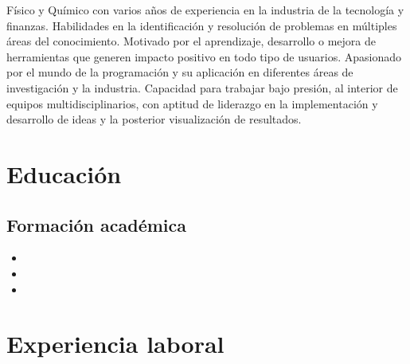 \documentclass[11pt, letterpaper, sans]{moderncv}        %
\begin{document}
\maketitle

\small{
Físico y Químico con varios años de experiencia en la industria de la tecnología y finanzas. Habilidades en la identificación y resolución de problemas en múltiples áreas del conocimiento. Motivado por el aprendizaje, desarrollo o mejora de herramientas que generen impacto positivo en todo tipo de usuarios. Apasionado por el mundo de la programación y su aplicaci\'on en diferentes \'areas de investigaci\'on y la industria. Capacidad para trabajar bajo presión, al interior de equipos multidisciplinarios, con aptitud de liderazgo en la implementaci\'on y desarrollo de ideas y la posterior visualizaci\'on de resultados.
}

\section{Educación}

\vspace{5pt}

\subsection{Formación académica}

\vspace{5pt}

\begin{itemize}
	\item{}
	\item{}
	\item{}
\end{itemize}

\vspace{2pt}

\section{Experiencia laboral}
\end{document}
